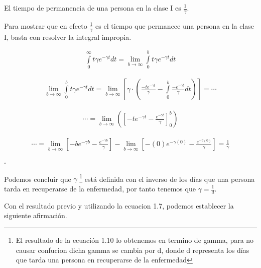 \begin{Af}
El tiempo de permanencia de una persona en la clase I es $\frac{1}{\gamma}$. \cite{Martcheva}
\end{Af}

\begin{Dem}

Para mostrar que en efecto $\frac{1}{\gamma}$ es el tiempo que permanece una persona en la clase I, basta con resolver la integral impropia.

\begin{align*} 
\int \limits_{0}^{\infty} t\gamma e^{-\gamma t} dt = \lim\limits_{b\rightarrow \infty} \int \limits_{0}^{b} t\gamma e^{-\gamma t}dt 
\end{align*}

\begin{align*}
\lim\limits_{b\rightarrow \infty} \int \limits_{0}^{b} t\gamma e^{-\gamma t}dt = \lim\limits_{b\rightarrow \infty} \left[ \gamma \cdot \left( \frac{-t e^{-\gamma t}}{\gamma} - \int \limits_{0}^{b} \frac{-e^{-\gamma t}}{\gamma} dt \right)\right] = \cdots
\end{align*}

\begin{align*}
\cdots = \lim\limits_{b\rightarrow \infty} \left( \left[ -te^{- \gamma t} - \frac{e^{-\gamma t}}{\gamma} \right]_0^b \right) 
\end{align*}

\begin{align*}
\cdots = \lim\limits_{b\rightarrow \infty} \left[ -be^{- \gamma b} - \frac{e^{- \gamma b}}{\gamma} \right] - \lim\limits_{b\rightarrow \infty} \left[ -(0)e^{- \gamma (0)} - \frac{e^{- \gamma (0)}}{\gamma} \right] = \frac{1}{\gamma}  \\
\end{align*}

\hfill	$\square$

\end{Dem}

Podemos concluir que $\gamma$ \footnote{El resultado de la ecuación 1.10 lo obtenemos en termino de gamma, para no causar confucion dicha gamma se cambia por d, donde d representa los días que tarda una persona en recuperarse de la enfermedad} está definida con el inverso de los días que una persona tarda en recuperarse de la enfermedad, por tanto tenemos que $\gamma = \frac{1}{d}$.

Con el resultado previo y utilizando la ecuacion 1.7, podemos establecer la siguiente afirmación.

